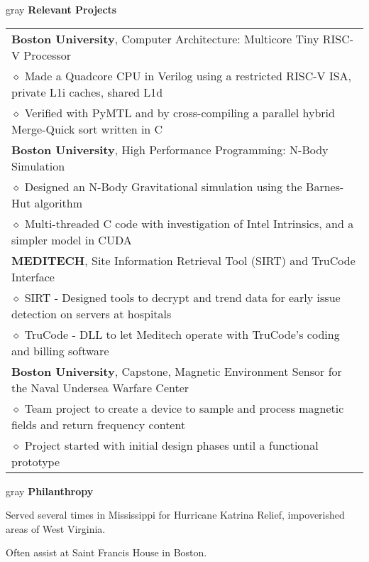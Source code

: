 \documentclass[10.5pt,letterpaper]{article}
\newcommand{\org}[1]{\textbf{#1}}
\newcommand{\pseudoitem}{\diamond}
\newcommand{\vertspace}{\vspace{1.2mm}}
\newcommand{\minorindent}{\hspace{4.5mm}}
\newcommand{\minoritem}{\minorindent $\pseudoitem$ }
\newcommand{\tablewidth}{.9\linewidth}
\newcommand{\undergrad}{Boston University}
\newcommand{\grad}{Boston University}
\begin{document}
	\vertspace
	\noindent
	\begin{heading}{gray}
		\textbf{Relevant Projects}
	\end{heading}
	\begin{tabular*}{\tablewidth}{@{\extracolsep{\fill}}l}
		\org{\grad}, Computer Architecture: Multicore Tiny RISC-V Processor\\
		\minoritem Made a Quadcore CPU in Verilog using a restricted RISC-V ISA, private L1i caches, shared L1d\\
		\minoritem Verified with PyMTL and by cross-compiling a parallel hybrid Merge-Quick sort written in C\\
		\org{\grad}, High Performance Programming: N-Body Simulation\\
		\minoritem Designed an N-Body Gravitational simulation using the Barnes-Hut algorithm\\
		\minoritem Multi-threaded C code with investigation of Intel Intrinsics, and a simpler model in CUDA\\
		\org{MEDITECH}, Site Information Retrieval Tool (SIRT) and TruCode Interface\\
		\minoritem SIRT - Designed tools to decrypt and trend data for early issue detection on servers at hospitals\\
		\minoritem TruCode - DLL to let Meditech operate with TruCode's coding and billing software\\
		\org{\undergrad}, Capstone, Magnetic Environment Sensor for the Naval Undersea Warfare Center\\
		\minoritem Team project to create a device to sample and process magnetic fields and return frequency content\\
		\minoritem Project started with initial design phases until a functional prototype\\
	\end{tabular*}
	

	
	\vertspace
	\noindent
	\begin{heading}{gray}
		\textbf{Philanthropy}
	\end{heading}
	Served several times in Mississippi for Hurricane Katrina Relief, impoverished areas of West Virginia.
	
	Often assist at Saint Francis House in Boston.
\end{document}
